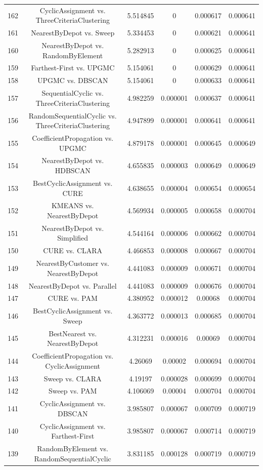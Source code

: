\documentclass[a4paper,10pt]{article}
\begin{document}
\begin{landscape}
\begin{table}[!htp]
\begin{tabular}{cccccc}
162&CyclicAssignment vs. ThreeCriteriaClustering&5.514845&0&0.000617&0.000641\\
161&NearestByDepot vs. Sweep&5.334453&0&0.000621&0.000641\\
160&NearestByDepot vs. RandomByElement&5.282913&0&0.000625&0.000641\\
159&Farthest-First vs. UPGMC&5.154061&0&0.000629&0.000641\\
158&UPGMC vs. DBSCAN&5.154061&0&0.000633&0.000641\\
157&SequentialCyclic vs. ThreeCriteriaClustering&4.982259&0.000001&0.000637&0.000641\\
156&RandomSequentialCyclic vs. ThreeCriteriaClustering&4.947899&0.000001&0.000641&0.000641\\
155&CoefficientPropagation vs. UPGMC&4.879178&0.000001&0.000645&0.000649\\
154&NearestByDepot vs. HDBSCAN&4.655835&0.000003&0.000649&0.000649\\
153&BestCyclicAssignment vs. CURE&4.638655&0.000004&0.000654&0.000654\\
152&KMEANS vs. NearestByDepot&4.569934&0.000005&0.000658&0.000704\\
151&NearestByDepot vs. Simplified&4.544164&0.000006&0.000662&0.000704\\
150&CURE vs. CLARA&4.466853&0.000008&0.000667&0.000704\\
149&NearestByCustomer vs. NearestByDepot&4.441083&0.000009&0.000671&0.000704\\
148&NearestByDepot vs. Parallel&4.441083&0.000009&0.000676&0.000704\\
147&CURE vs. PAM&4.380952&0.000012&0.00068&0.000704\\
146&BestCyclicAssignment vs. Sweep&4.363772&0.000013&0.000685&0.000704\\
145&BestNearest vs. NearestByDepot&4.312231&0.000016&0.00069&0.000704\\
144&CoefficientPropagation vs. CyclicAssignment&4.26069&0.00002&0.000694&0.000704\\
143&Sweep vs. CLARA&4.19197&0.000028&0.000699&0.000704\\
142&Sweep vs. PAM&4.106069&0.00004&0.000704&0.000704\\
141&CyclicAssignment vs. DBSCAN&3.985807&0.000067&0.000709&0.000719\\
140&CyclicAssignment vs. Farthest-First&3.985807&0.000067&0.000714&0.000719\\
139&RandomByElement vs. RandomSequentialCyclic&3.831185&0.000128&0.000719&0.000719\\

\end{tabular}
\end{table}
\end{landscape}
\end{document}
